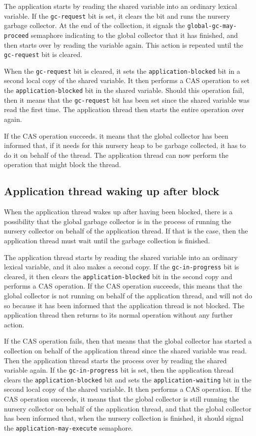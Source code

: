 The application starts by reading the shared variable into an ordinary
lexical variable.  If the \texttt{gc-request} bit is set, it clears
the bit and runs the nursery garbage collector.  At the end of the
collection, it signals the \texttt{global-gc-may-proceed} semaphore
indicating to the global collector that it has finished, and then
starts over by reading the variable again.  This action is repeated
until the \texttt{gc-request} bit is cleared.

When the \texttt{gc-request} bit is cleared, it sets the
\texttt{application-blocked} bit in a second local copy of the shared
variable.  It then performs a CAS operation to set the
\texttt{application-blocked} bit in the shared variable.  Should this
operation fail, then it means that the \texttt{gc-request} bit has
been set since the shared variable was read the first time.  The
application thread then starts the entire operation over again.

If the CAS operation succeeds. it means that the global collector has
been informed that, if it needs for this nursery heap to be garbage
collected, it has to do it on behalf of the thread.  The application
thread can now perform the operation that might block the thread.

\subsection{Application thread waking up after block}

When the application thread wakes up after having been blocked, there
is a possibility that the global garbage collector is in the process
of running the nursery collector on behalf of the application thread.
If that is the case, then the application thread must wait until the
garbage collection is finished.

The application thread starts by reading the shared variable into an
ordinary lexical variable, and it also makes a second copy.  If the
\texttt{gc-in-progress} bit is cleared, it then clears the
\texttt{application-blocked} bit in the second copy and performs a CAS
operation.  If the CAS operation succeeds, this means that the global
collector is not running on behalf of the application thread, and will
not do so because it has been informed that the application thread is
not blocked.  The application thread then returns to its normal
operation without any further action.

If the CAS operation fails, then that means that the global collector
has started a collection on behalf of the application thread since the
shared variable was read.  Then the application thread starts the
process over by reading the shared variable again.  If the
\texttt{gc-in-progress} bit is set, then the application thread clears
the \texttt{application-blocked} bit and sets the
\texttt{application-waiting} bit in the second local copy of the
shared variable.  It then performs a CAS operation.  If the CAS
operation succeeds, it means that the global collector is still
running the nursery collector on behalf of the application thread, and
that the global collector has been informed that, when the nursery
collection is finished, it should signal the
\texttt{application-may-execute} semaphore.

